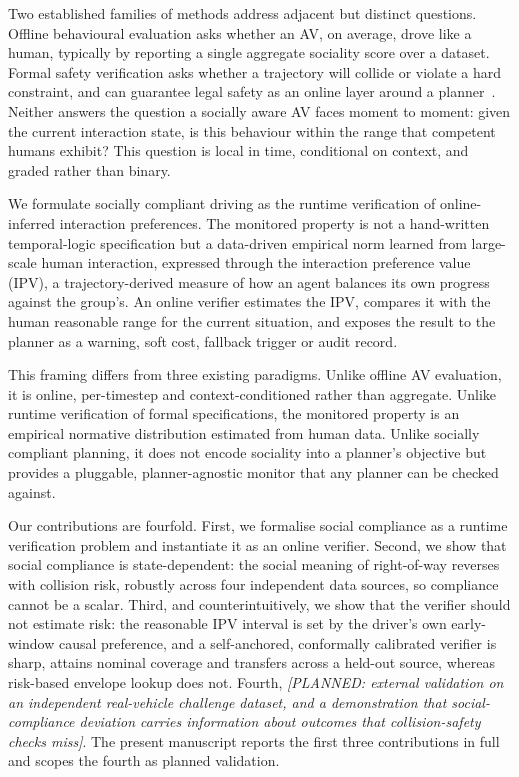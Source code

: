 \documentclass[12pt,a4paper]{article}
\newcommand{\planned}[1]{{\color{blue!60!black}\textit{[PLANNED: #1]}}}
\begin{document}
Two established families of methods address adjacent but distinct questions. Offline
behavioural evaluation asks whether an AV, on average, drove like a human, typically by
reporting a single aggregate sociality score over a dataset. Formal safety verification asks
whether a trajectory will collide or violate a hard constraint, and can guarantee legal
safety as an online layer around a planner~\cite{pek2020online}. Neither answers the
question a socially aware AV faces moment to moment: given the current interaction state, is
this behaviour within the range that competent humans exhibit? This question is local in
time, conditional on context, and graded rather than binary.

We formulate socially compliant driving as the runtime verification of online-inferred
interaction preferences. The monitored property is not a hand-written temporal-logic
specification but a data-driven empirical norm learned from large-scale human interaction,
expressed through the interaction preference value (IPV), a trajectory-derived measure of
how an agent balances its own progress against the group's. An online verifier estimates the
IPV, compares it with the human reasonable range for the current situation, and exposes the
result to the planner as a warning, soft cost, fallback trigger or audit record.

This framing differs from three existing paradigms. Unlike offline AV evaluation, it is
online, per-timestep and context-conditioned rather than aggregate. Unlike runtime
verification of formal specifications, the monitored property is an empirical normative
distribution estimated from human data. Unlike socially compliant planning, it does not
encode sociality into a planner's objective but provides a pluggable, planner-agnostic
monitor that any planner can be checked against.

Our contributions are fourfold. First, we formalise social compliance as a runtime
verification problem and instantiate it as an online verifier. Second, we show that social
compliance is state-dependent: the social meaning of right-of-way reverses with collision
risk, robustly across four independent data sources, so compliance cannot be a scalar.
Third, and counterintuitively, we show that the verifier should not estimate risk: the
reasonable IPV interval is set by the driver's own early-window causal preference, and a
self-anchored, conformally calibrated verifier is sharp, attains nominal coverage and
transfers across a held-out source, whereas risk-based envelope lookup does not. Fourth,
\planned{external validation on an independent real-vehicle challenge dataset, and a
demonstration that social-compliance deviation carries information about outcomes that
collision-safety checks miss}. The present manuscript reports the first three contributions
in full and scopes the fourth as planned validation.
\end{document}
